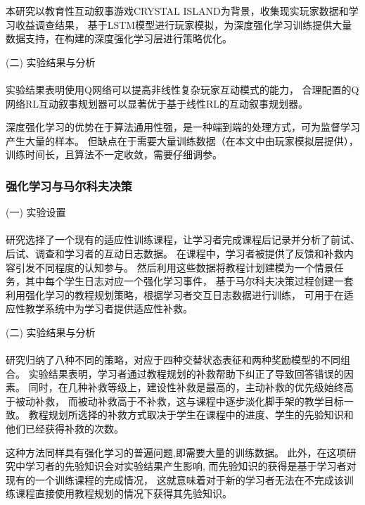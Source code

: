 \documentclass{article}
\begin{document}
            本研究以教育性互动叙事游戏CRYSTAL ISLAND为背景，收集现实玩家数据和学习收益调查结果，
            基于LSTM模型进行玩家模拟，为深度强化学习训练提供大量数据支持，在构建的深度强化学习层进行策略优化。

            (二) 实验结果与分析\paragraph{}
            实验结果表明使用Q网络可以提高非线性复杂玩家互动模式的能力，
            合理配置的Q网络RL互动叙事规划器可以显著优于基于线性RL的互动叙事规划器。

            深度强化学习的优势在于算法通用性强，是一种端到端的处理方式，可为监督学习产生大量的样本。
            但缺点在于需要大量训练数据（在本文中由玩家模拟层提供），训练时间长，且算法不一定收敛，需要仔细调参。

            \subsubsection{强化学习与马尔科夫决策}
            (一) 实验设置\paragraph{}
            研究选择了一个现有的适应性训练课程，让学习者完成课程后记录并分析了前试、后试、调查和学习者的互动日志数据。
            在课程中，学习者被提供了反馈和补救内容引发不同程度的认知参与。
            然后利用这些数据将教程计划建模为一个情景任务，其中每个学生日志对应一个强化学习事件，
            基于马尔科夫决策过程创建一套利用强化学习的教程规划策略，根据学习者交互日志数据进行训练，
            可用于在适应性教学系统中为学习者提供适应性补救。

            (二) 实验结果与分析\paragraph{}
            研究归纳了八种不同的策略，对应于四种交替状态表征和两种奖励模型的不同组合。
            实验结果表明，学习者通过教程规划的补救帮助下纠正了导致回答错误的因素。
            同时，在几种补救等级上，建设性补救是最高的，主动补救的优先级始终高于被动补救，
            而被动补救高于不补救，这与课程中逐步淡化脚手架的教学目标一致。
            教程规划所选择的补救方式取决于学生在课程中的进度、学生的先验知识和他们已经获得补救的次数。


            这种方法同样具有强化学习的普遍问题,即需要大量的训练数据。
            此外，在这项研究中学习者的先验知识会对实验结果产生影响,
            而先验知识的获得是基于学习者对现有的一个训练课程的完成情况，
            这就意味着对于新的学习者无法在不完成该训练课程直接使用教程规划的情况下获得其先验知识。
\end{document}
